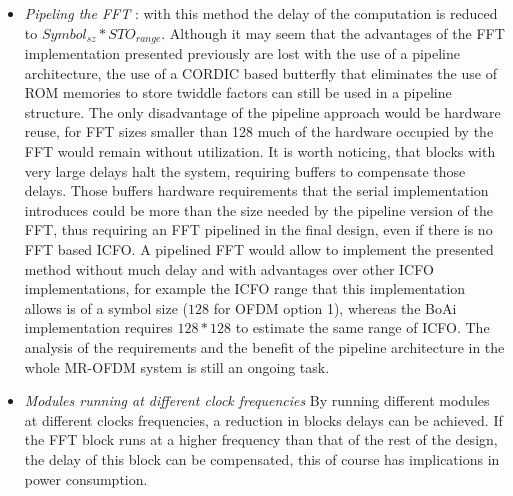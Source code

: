 \begin{itemize}
\item \emph{Pipeling the FFT} : with this method the delay of the computation is reduced to $Symbol_{sz}*STO_{range}$. Although it may seem that the advantages of the FFT implementation presented previously are lost with the use of a pipeline architecture, the use of a CORDIC based butterfly that eliminates the use of ROM memories to store twiddle factors can still be used in a pipeline structure. The only disadvantage of the pipeline approach would be hardware reuse, for FFT sizes smaller than 128 much of the hardware occupied by the FFT would remain without utilization. It is worth noticing, that blocks with very large delays halt the system, requiring buffers to compensate those delays. Those buffers hardware requirements that the serial implementation introduces could be more than the size needed by the pipeline version of the FFT, thus requiring an FFT pipelined in the final design, even if there is no FFT based ICFO. A pipelined FFT would allow to implement the presented method without much delay and with advantages over other ICFO implementations, for example the ICFO range that this implementation allows is of a symbol size ($128$ for OFDM option 1), whereas the BoAi implementation requires $128*128$ to estimate the same range of ICFO. The analysis of the requirements and the benefit of the pipeline architecture in the whole MR-OFDM system is still an ongoing task.

\item \emph{Modules running at different clock frequencies} By running different modules at different clocks frequencies, a reduction in blocks delays can be achieved. If the FFT block runs at a higher frequency than that of the rest of the design, the delay of this block can be compensated, this of course has implications in power consumption. 

\end{itemize}
 
 



